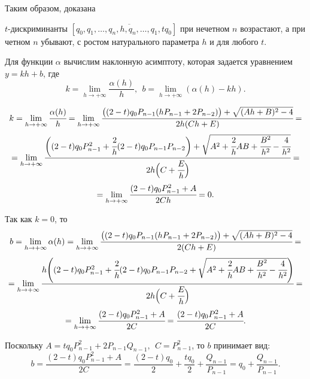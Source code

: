 Таким образом, доказана
\begin{theoremr}\label{PiskunovaTretyakov:th:2}
$t$-дискриминанты $[{q_0},\overline{{q_1},\dots,{q_n},{h},{q_n},\dots,{q_1},t{q_0}}]$ при нечетном $n$ возрастают, а при четном $n$ убывают, с ростом натурального параметра $h$ и для любого $t$.
\end{theoremr}

Для функции $\alpha$ вычислим наклонную асимптоту, которая задается уравнением $y=kh+b$, где
\[k=\lim_{h\to +\infty}\frac {\alpha(h)}h, \ \ b=\lim_{h\to +\infty}(\alpha(h)-kh). \]

\[k=\lim_{h\to +\infty}\cfrac {\alpha(h)}h=\lim_{h\to +\infty}\cfrac {\bigl((2-t){q_0}{P_{n-1}}(h{P_{n-1}}+2{P_{n-2}})\bigr)+\sqrt{(Ah+B)^2-4}}{2h(Ch+E)}=\]
\[=\lim_{h\to +\infty}\cfrac {\biggl((2-t){q_0}{P^{2}_{n-1}}+\cfrac {2}{h}(2-t){q_0}{P_{n-1}}{P_{n-2}}\biggr)+\sqrt{A^2+\cfrac {2}{h}AB+\cfrac {B^2}{h^2}-\cfrac 4{h^2}}}{2h\Bigl(C+\cfrac Eh\Bigr)}=\]
\[=\lim_{h\to +\infty}\cfrac {(2-t){q_0}{P^{2}_{n-1}}+A}{2Ch}=0.\]

Так как $k=0$, то
\[b=\lim_{h\to +\infty}\alpha(h)=
\lim_{h\to +\infty}\cfrac {\bigl((2-t){q_0}{P_{n-1}}(h{P_{n-1}}+2{P_{n-2}})\bigr)+\sqrt{(Ah+B)^2-4}}{2(Ch+E)}=\]
\[=\lim_{h\to +\infty}\cfrac {h\Biggl((2-t){q_0}{P^{2}_{n-1}}+\cfrac {2}{h}(2-t){q_0}{P_{n-1}}{P_{n-2}}+\sqrt{A^2+\cfrac {2}{h}AB+\cfrac {B^2}{h^2}-\cfrac 4{h^2}}\Biggr)}{2h\Bigl(C+\cfrac Eh\Bigr)}=\]
\[=\lim_{h\to +\infty}\cfrac {(2-t){q_0}{P^{2}_{n-1}}+A}{2C}=\cfrac {(2-t){q_0}{P^{2}_{n-1}}+A}{2C}.\]

Поскольку $A=t{q_0}P^{2}_{n-1}+2{P_{n-1}}{Q_{n-1}},\ \ C=P^{2}_{n-1}$, то $b$ принимает вид:
\[b=\frac {(2-t){q_0}{P^{2}_{n-1}}+A}{2C}=
\frac {(2-t){q_0}}{2}+\frac {tq_0}{2}+\frac {Q_{n-1}}{P_{n-1}}={q_0}+\frac {Q_{n-1}}{P_{n-1}}.\]

